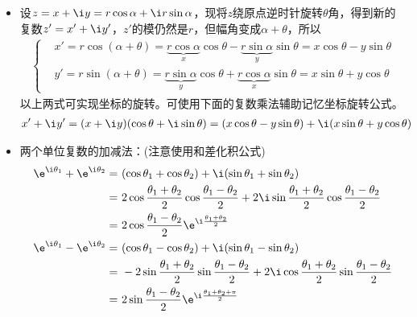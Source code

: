 \begin{itemize}[leftmargin=\inteval{\myitemleftmargin}pt,itemsep=
   \inteval{\myitemitempsep}pt,topsep=\inteval{\myitemtopsep}pt]
\item 设$ z=x+\i y=r\cos \alpha+\i r\sin \alpha $，现将$ z $绕原点逆时针旋转$ \theta $角，得到新的复数$ z'=x'+\i y' $，$ z' $的模仍然是$ r $，但幅角变成$ \alpha+\theta $，所以
\begin{gather}\label{坐标旋转公式}
\left\{ \begin{aligned}
    & x'=r\cos (\alpha+\theta)=\underbrace{r\cos\alpha}_{x}
    \cos\theta-	\underbrace{r\sin\alpha}_{y}\sin\theta	
    =x\cos\theta-y\sin\theta\\
    & y'=r\sin (\alpha+\theta)=\underbrace{r\sin\alpha}_{y}
    \cos\theta+\underbrace{r\cos\alpha}_{x}\sin\theta
    =x\sin\theta+y\cos\theta
\end{aligned} \right. 
\end{gather}
以上两式可实现坐标的旋转。可使用下面的复数乘法辅助记忆坐标旋转公式。
\begin{gather*}
x'+\i y'=(x+\i y)(\cos\theta +\i\sin\theta)
=(x\cos\theta-y\sin\theta)+\i(x\sin\theta+y\cos\theta)
\end{gather*} 
\item 两个单位复数的加减法：(注意使用和差化积公式)
\begin{align*}
    \e^{\i\theta_1}+\e^{\i\theta_2}=&\ (\cos\theta_1+\cos\theta_2)+\i(\sin\theta_1+\sin\theta_2)\\
    =&\ 2\cos\dfrac{\theta_1+\theta_2}{2}\cos\dfrac{\theta_1-\theta_2}{2}+
    2\i\sin\dfrac{\theta_1+\theta_2}{2}\cos\dfrac{\theta_1-\theta_2}{2} \\
    =&\ 2\cos\dfrac{\theta_1-\theta_2}{2}\e^{\i\frac{\theta_1+\theta_2}{2}}  \\
    \e^{\i\theta_1}-\e^{\i\theta_2}=&\ (\cos\theta_1-\cos\theta_2)+\i(\sin\theta_1-\sin\theta_2)\\
    =&\ -2\sin\dfrac{\theta_1+\theta_2}{2}\sin\dfrac{\theta_1-\theta_2}{2}+
    2\i\cos\dfrac{\theta_1+\theta_2}{2}\sin\dfrac{\theta_1-\theta_2}{2} \\
    =&\ 2\sin\dfrac{\theta_1-\theta_2}{2}\e^{\i\frac{\theta_1+\theta_2+\pi}{2}}  
\end{align*}

\end{itemize}

